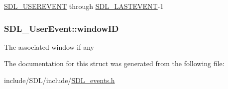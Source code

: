 \hyperlink{_s_d_l__events_8h_a3b589e89be6b35c02e0dd34a55f3fccaa4364c23f54802309e83fdb9b1c07c719}{S\-D\-L\-\_\-\-U\-S\-E\-R\-E\-V\-E\-N\-T} through \hyperlink{_s_d_l__events_8h_a3b589e89be6b35c02e0dd34a55f3fccaaffeac40a4ff366717c0ebc74118ea2ae}{S\-D\-L\-\_\-\-L\-A\-S\-T\-E\-V\-E\-N\-T}-\/1 \hypertarget{struct_s_d_l___user_event_abccefa10e0e0e3a0801bc6d836a08da7}{
\subsubsection[{window\-I\-D}]{ S\-D\-L\-\_\-\-User\-Event\-::window\-I\-D}}\label{struct_s_d_l___user_event_abccefa10e0e0e3a0801bc6d836a08da7}
The associated window if any 

The documentation for this struct was generated from the following file\-:\begin{DoxyCompactItemize}
\item 
include/\-S\-D\-L/include/\hyperlink{_s_d_l__events_8h}{S\-D\-L\-\_\-events.\-h}\end{DoxyCompactItemize}

